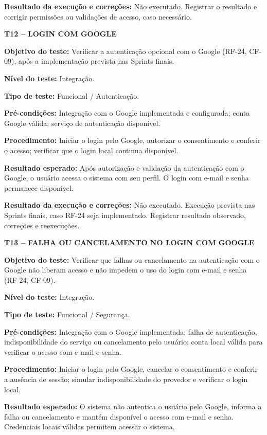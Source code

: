 \noindent\textbf{Resultado da execução e correções:} Não executado. Registrar o resultado e corrigir permissões ou validações de acesso, caso necessário.

\textbf{T12 -- LOGIN COM GOOGLE}

\noindent\textbf{Objetivo do teste:} Verificar a autenticação opcional com o Google (RF-24, CF-09), após a implementação prevista nas Sprints finais.

\noindent\textbf{Nível do teste:} Integração.

\noindent\textbf{Tipo de teste:} Funcional / Autenticação.

\noindent\textbf{Pré-condições:} Integração com o Google implementada e configurada; conta Google válida; serviço de autenticação disponível.

\noindent\textbf{Procedimento:} Iniciar o login pelo Google, autorizar o consentimento e conferir o acesso; verificar que o login local continua disponível.

\noindent\textbf{Resultado esperado:} Após autorização e validação da autenticação com o Google, o usuário acessa o sistema com seu perfil. O login com e-mail e senha permanece disponível.

\noindent\textbf{Resultado da execução e correções:} Não executado. Execução prevista nas Sprints finais, caso RF-24 seja implementado. Registrar resultado observado, correções e reexecuções.

\textbf{T13 -- FALHA OU CANCELAMENTO NO LOGIN COM GOOGLE}

\noindent\textbf{Objetivo do teste:} Verificar que falhas ou cancelamento na autenticação com o Google não liberam acesso e não impedem o uso do login com e-mail e senha (RF-24, CF-09).

\noindent\textbf{Nível do teste:} Integração.

\noindent\textbf{Tipo de teste:} Funcional / Segurança.

\noindent\textbf{Pré-condições:} Integração com o Google implementada; falha de autenticação, indisponibilidade do serviço ou cancelamento pelo usuário; conta local válida para verificar o acesso com e-mail e senha.

\noindent\textbf{Procedimento:} Iniciar o login pelo Google, cancelar o consentimento e conferir a ausência de sessão; simular indisponibilidade do provedor e verificar o login local.

\noindent\textbf{Resultado esperado:} O sistema não autentica o usuário pelo Google, informa a falha ou cancelamento e mantém disponível o acesso com e-mail e senha. Credenciais locais válidas permitem acessar o sistema.

